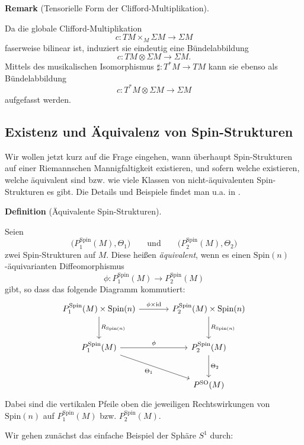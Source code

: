 \documentclass[10pt, letterpaper]{article}
\newcommand{\id}{\operatorname{id}}
\newcommand{\SO}{\mathrm{SO}}
\newcommand{\Spin}{\mathrm{Spin}}
\newcommand{\CustomHeading}[3]{%
  \par\medskip\noindent%
  \textbf{#1 #2} \textnormal{(#3)}.\enskip%
}
\newenvironment{DEF}[2]{\CustomHeading{Definition}{#1}{#2}}{}
\newenvironment{REM}[2]{\CustomHeading{Remark}{#1}{#2}}{}
\begin{document}
\begin{REM}{}{Tensorielle Form der Clifford-Multiplikation}
Da die globale Clifford-Multiplikation
\[
c:TM\times_M \Sigma M\to \Sigma M
\]
faserweise bilinear ist, induziert sie eindeutig eine Bündelabbildung
\[
c:TM\otimes \Sigma M\to \Sigma M.
\]
Mittels des musikalischen Isomorphismus $\sharp:T^*M\to TM$ kann sie ebenso als
Bündelabbildung
\[
c:T^*M\otimes \Sigma M\to \Sigma M
\]
aufgefasst werden.
\end{REM}


\subsection{Existenz und Äquivalenz von Spin-Strukturen}


Wir wollen jetzt kurz auf die Frage eingehen, wann überhaupt Spin-Strukturen auf einer Riemannschen Mannigfaltigkeit existieren, und sofern welche existieren, welche äquivalent sind bzw. wie viele Klassen von nicht-äquivalenten Spin-Strukturen es gibt. Die Details und Beispiele findet man u.a. in \parencite[p.~85-93]{LawsonMichelsohn2016}. 


\begin{DEF}{}{Äquivalente Spin-Strukturen}
Seien
\[
\bigl(P_1^{\Spin}(M),\Theta_1\bigr)
\qquad\text{und}\qquad
\bigl(P_2^{\Spin}(M),\Theta_2\bigr)
\]
zwei Spin-Strukturen auf \(M\). Diese heißen \emph{äquivalent}, wenn es einen
\(\Spin(n)\)-äquivarianten Diffeomorphismus
\[
\phi:P_1^{\Spin}(M)\to P_2^{\Spin}(M)
\]
gibt, so dass das folgende Diagramm kommutiert:
\[
\begin{tikzcd}[column sep=large, row sep=large]
P_1^{\Spin}(M)\times \Spin(n) \arrow[r,"\phi\times \id"] \arrow[d,"R_{\Spin(n)}"] &
P_2^{\Spin}(M)\times \Spin(n) \arrow[d,"R_{\Spin(n)}"] \\
P_1^{\Spin}(M) \arrow[r,"\phi"] \arrow[dr,"\Theta_1"'] &
P_2^{\Spin}(M) \arrow[d,"\Theta_2"] \\
& P^{\SO}(M)
\end{tikzcd}
\]
Dabei sind die vertikalen Pfeile oben die jeweiligen Rechtswirkungen von
\(\Spin(n)\) auf \(P_1^{\Spin}(M)\) bzw. \(P_2^{\Spin}(M)\).
\end{DEF}

\bigskip

Wir gehen zunächst das einfache Beispiel der Sphäre $S^1$ durch:
\end{document}
